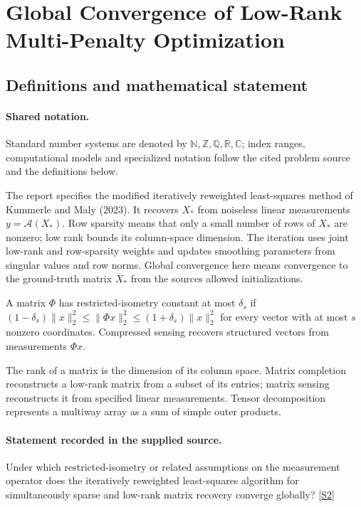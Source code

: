 \documentclass[11pt]{article}
\newcommand{\sref}[2]{\hyperlink{source:#1:#2}{[S#2]}}
\begin{document}
\section{Global Convergence of Low-Rank Multi-Penalty Optimization}\label{statement}

\subsection{Definitions and mathematical statement}

\paragraph{Shared notation.}Standard number systems are denoted by $\mathbb N,\mathbb Z,\mathbb Q,\mathbb R,\mathbb C$; index ranges, computational models and specialized notation follow the cited problem source and the definitions below.


The report specifies the modified iteratively reweighted least-squares method of Kummerle and Maly (2023). It recovers $X_*$ from noiseless linear measurements $y=\mathcal A(X_*)$. Row sparsity means that only a small number of rows of $X_*$ are nonzero; low rank bounds its column-space dimension. The iteration uses joint low-rank and row-sparsity weights and updates smoothing parameters from singular values and row norms. Global convergence here means convergence to the ground-truth matrix $X_*$ from the source\textquotesingle s allowed initializations.

A matrix $\Phi$ has restricted-isometry constant at most $\delta_s$ if $(1-\delta_s)\lVert x\rVert_2^2\leq\lVert\Phi x\rVert_2^2\leq(1+\delta_s)\lVert x\rVert_2^2$ for every vector with at most $s$ nonzero coordinates. Compressed sensing recovers structured vectors from measurements $\Phi x$.

The rank of a matrix is the dimension of its column space. Matrix completion reconstructs a low-rank matrix from a subset of its entries; matrix sensing reconstructs it from specified linear measurements. Tensor decomposition represents a multiway array as a sum of simple outer products.
\paragraph{Statement recorded in the supplied source.}
Under which restricted-isometry or related assumptions on the measurement operator does the iteratively reweighted least-squares algorithm for simultaneously sparse and low-rank matrix recovery converge globally? \sref{statement}{2}
\end{document}
